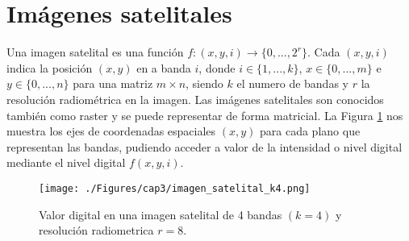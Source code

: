 \section{Im\'agenes satelitales}

Una imagen satelital es una funci\'on $ f:(x,y,i) \longrightarrow \{0,...,2^{r}\} $. Cada $ (x,y,i) $ indica la posición $ (x,y) $ en a banda $ i $, donde $ i \in \{1,...,k\} $, $ x \in \{0,...,m\} $ e $ y \in \{0,...,n\} $ para una matriz $ m \times n $, siendo $ k $ el numero de bandas y $ r $ la resoluci\'on radiom\'etrica en la imagen. Las im\'agenes satelitales son conocidos tambi\'en como raster \cite{vasquez2011mineria} y se puede representar de forma matricial. La Figura \ref{fig:imagenMultiespectral} nos muestra los ejes de coordenadas espaciales $ (x,y) $ para cada plano que representan las bandas, pudiendo acceder a valor de la intensidad o nivel digital mediante el nivel digital  $ f(x,y,i) $.
  \begin{figure}[H]
  	\centering
  	\texttt{[image: ./Figures/cap3/imagen\_satelital\_k4.png]}
  	\caption{Valor digital en una imagen satelital de 4 bandas $ (k=4) $ y resoluci\'on radiometrica $ r=8 $.}
  	\label{fig:imagenMultiespectral}
  \end{figure}



